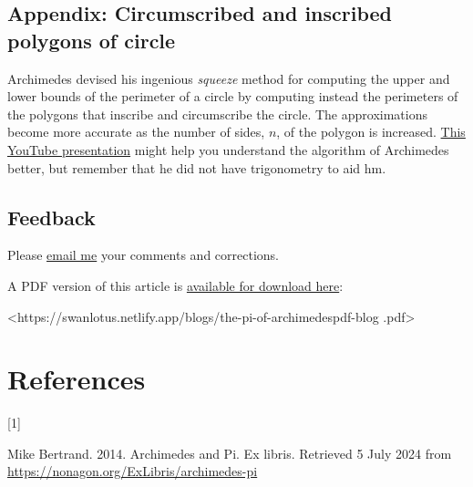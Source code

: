 \documentclass[
  a4paper,
]{article}
\newlength{\cslhangindent}
\newlength{\csllabelwidth}
\newenvironment{CSLReferences}[2] %
 {\begin{list}{}{%
  \setlength{\itemindent}{0pt}
  \setlength{\leftmargin}{0pt}
  \setlength{\parsep}{0pt}
  \ifodd #1
   \setlength{\leftmargin}{\cslhangindent}
   \setlength{\itemindent}{-1\cslhangindent}
  \fi
  \setlength{\itemsep}{#2\baselineskip}}}
 {\end{list}}
\newcommand{\CSLLeftMargin}[1]{\parbox[t]{\csllabelwidth}{\strut#1\strut}}
\newcommand{\CSLRightInline}[1]{\parbox[t]{\linewidth - \csllabelwidth}{\strut#1\strut}}
\begin{document}
\subsection{Appendix: Circumscribed and inscribed polygons of
circle}\label{appendix-circumscribed-and-inscribed-polygons-of-circle}

Archimedes devised his ingenious \emph{squeeze} method for computing the
upper and lower bounds of the perimeter of a circle by computing instead
the perimeters of the polygons that inscribe and circumscribe the
circle. The approximations become more accurate as the number of sides,
\(n\), of the polygon is increased.
\href{https://www.youtube.com/watch?v=_qdnyw5Eb_Y}{This YouTube
presentation} might help you understand the algorithm of Archimedes
better, but remember that he did not have trigonometry to aid hm.

\subsection{Feedback}\label{feedback}

Please \href{mailto:feedback.swanlotus@gmail.com}{email me} your
comments and corrections.

\noindent A PDF version of this article is
\href{./the-pi-of-archimedes.pdf}{available for download here}:

\begin{small}

\begin{sffamily}

\textless https://swanlotus.netlify.app/blogs/the-pi-of-archimedespdf-blog
.pdf\textgreater{}

\end{sffamily}

\end{small}

\section*{References}\label{bibliography}

\label{refs}
\begin{CSLReferences}{0}{0}
\CSLLeftMargin{{[}1{]} }%
\CSLRightInline{Mike Bertrand. 2014. {Archimedes and Pi}. Ex libris.
Retrieved 5 July 2024 from
\url{https://nonagon.org/ExLibris/archimedes-pi}}

\end{CSLReferences}
\end{document}
